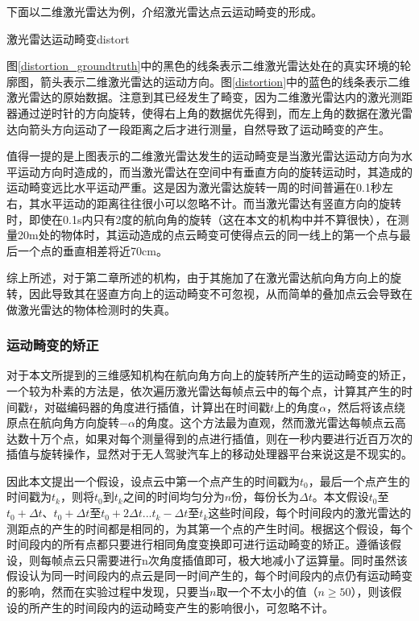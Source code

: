 下面以二维激光雷达为例，介绍激光雷达点云运动畸变的形成。

\begin{pics}[htbp]{激光雷达运动畸变}{distort}
\end{pics}

图\ref{distortion_groundtruth}中的黑色的线条表示二维激光雷达处在的真实环境的轮廓图，箭头表示二维激光雷达的运动方向。图\ref{distortion}中的蓝色的线条表示二维激光雷达的原始数据。注意到其已经发生了畸变，因为二维激光雷达内的激光测距器通过逆时针的方向旋转，使得右上角的数据优先得到，而左上角的数据在激光雷达向箭头方向运动了一段距离之后才进行测量，自然导致了运动畸变的产生。

值得一提的是上图表示的二维激光雷达发生的运动畸变是当激光雷达运动方向为水平运动方向时造成的，而当激光雷达在空间中有垂直方向的旋转运动时，其造成的运动畸变远比水平运动严重。这是因为激光雷达旋转一周的时间普遍在0.1秒左右，其水平运动的距离往往很小可以忽略不计。而当激光雷达有竖直方向的旋转时，即使在0.1s内只有2度的航向角的旋转（这在本文的机构中并不算很快），在测量20m处的物体时，其运动造成的点云畸变可使得点云的同一线上的第一个点与最后一个点的垂直相差将近70cm。

综上所述，对于第二章所述的机构，由于其施加了在激光雷达航向角方向上的旋转，因此导致其在竖直方向上的运动畸变不可忽视，从而简单的叠加点云会导致在做激光雷达的物体检测时的失真。

\subsubsection{运动畸变的矫正}

对于本文所提到的三维感知机构在航向角方向上的旋转所产生的运动畸变的矫正，一个较为朴素的方法是，依次遍历激光雷达每帧点云中的每个点，计算其产生的时间戳$t$，对磁编码器的角度进行插值，计算出在时间戳$t$上的角度$\alpha$，然后将该点绕原点在航向角方向旋转$-\alpha$的角度。这个方法最为直观，然而激光雷达每帧点云高达数十万个点，如果对每个测量得到的点进行插值，则在一秒内要进行近百万次的插值与旋转操作，显然对于无人驾驶汽车上的移动处理器平台来说这是不现实的。

因此本文提出一个假设，设点云中第一个点产生的时间戳为$t_0$，最后一个点产生的时间戳为$t_k$，则将$t_0$到$t_k$之间的时间均匀分为$n$份，每份长为$\Delta t$。本文假设$t_0$至$t_0+\Delta t$、$t_0+\Delta t$至$t_0+2\Delta t$...$t_k-\Delta t$至$t_k$这些时间段，每个时间段内的激光雷达的测距点的产生的时间都是相同的，为其第一个点的产生时间。根据这个假设，每个时间段内的所有点都只要进行相同角度变换即可进行运动畸变的矫正。遵循该假设，则每帧点云只需要进行n次角度插值即可，极大地减小了运算量。同时虽然该假设认为同一时间段内的点云是同一时间产生的，每个时间段内的点仍有运动畸变的影响，然而在实验过程中发现，只要当$n$取一个不太小的值（$n\geq 50$），则该假设的所产生的时间段内的运动畸变产生的影响很小，可忽略不计。

